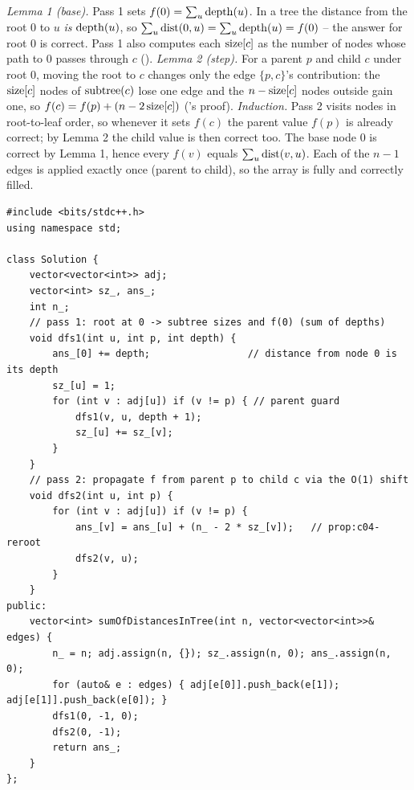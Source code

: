 \begin{proofbox}
\emph{Lemma 1 (base).} Pass 1 sets $f(0)=\sum_u \operatorname{depth}(u)$. In a tree the distance from the
root $0$ to $u$ \emph{is} $\operatorname{depth}(u)$, so $\sum_u \operatorname{dist}(0,u)=\sum_u\operatorname{depth}(u)=f(0)$ -- the
answer for root $0$ is correct. Pass 1 also computes each $\operatorname{size}[c]$ as the number of nodes
whose path to $0$ passes through $c$ (). \emph{Lemma 2 (step).} For a
parent $p$ and child $c$ under root $0$, moving the root to $c$ changes only the edge
$\{p,c\}$'s contribution: the $\operatorname{size}[c]$ nodes of $\operatorname{subtree}(c)$ lose one edge and the
$n-\operatorname{size}[c]$ nodes outside gain one, so $f(c)=f(p)+(n-2\operatorname{size}[c])$ ('s
proof). \emph{Induction.} Pass 2 visits nodes in root-to-leaf order, so whenever it sets
$f(c)$ the parent value $f(p)$ is already correct; by Lemma 2 the child value is then
correct too. The base node $0$ is correct by Lemma 1, hence every $f(v)$ equals
$\sum_u \operatorname{dist}(v,u)$. Each of the $n-1$ edges is applied exactly once (parent to child), so
the array is fully and correctly filled.
\end{proofbox}

\begin{lstlisting}[caption={Sum of Distances in Tree (LeetCode 834) -- root once, then reroot}, label={lst:c04-summit}]
#include <bits/stdc++.h>
using namespace std;

class Solution {
    vector<vector<int>> adj;
    vector<int> sz_, ans_;
    int n_;
    // pass 1: root at 0 -> subtree sizes and f(0) (sum of depths)
    void dfs1(int u, int p, int depth) {
        ans_[0] += depth;                 // distance from node 0 is its depth
        sz_[u] = 1;
        for (int v : adj[u]) if (v != p) { // parent guard
            dfs1(v, u, depth + 1);
            sz_[u] += sz_[v];
        }
    }
    // pass 2: propagate f from parent p to child c via the O(1) shift
    void dfs2(int u, int p) {
        for (int v : adj[u]) if (v != p) {
            ans_[v] = ans_[u] + (n_ - 2 * sz_[v]);   // prop:c04-reroot
            dfs2(v, u);
        }
    }
public:
    vector<int> sumOfDistancesInTree(int n, vector<vector<int>>& edges) {
        n_ = n; adj.assign(n, {}); sz_.assign(n, 0); ans_.assign(n, 0);
        for (auto& e : edges) { adj[e[0]].push_back(e[1]); adj[e[1]].push_back(e[0]); }
        dfs1(0, -1, 0);
        dfs2(0, -1);
        return ans_;
    }
};
\end{lstlisting}

